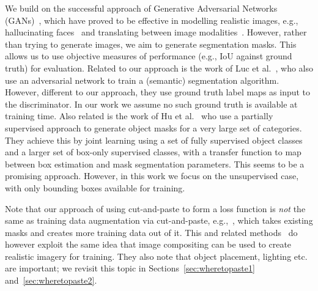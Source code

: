 \documentclass[runningheads]{llncs}
\begin{document}
We build on the successful approach of Generative Adversarial Networks (GANs)~\cite{goodfellow2014generative},
which have proved to be effective in modelling realistic images, e.g., hallucinating faces~\cite{karras2017progressive} and translating between image modalities~\cite{isola2017image}. 
However, rather than trying to generate images, we aim to generate segmentation masks. This allows us to use objective measures of performance (e.g., IoU against ground truth) for evaluation.
Related to our approach is the work of Luc et al.~\cite{luc2016semantic}, who also use an adversarial network to train a (semantic) segmentation algorithm. However, different to our approach, they use ground truth label maps as input to the discriminator. In our work we assume no such ground truth is available at training time.
Also related is the work of Hu et al.~\cite{hu2017learning} who use a partially supervised approach to generate object masks for a very large set of categories. 
They achieve this by joint learning using a set of fully supervised object classes and a larger set of box-only supervised classes, with a transfer function to map between box estimation and mask segmentation parameters. 
This seems to be a promising approach. 
However, in this work we focus on the unsupervised case, with only bounding boxes available for training.

Note that our approach of using cut-and-paste to form a loss function is \emph{not} the same as training data augmentation via cut-and-paste, e.g.,~\cite{dwibedi2017cut}, which takes existing masks and creates more training data out of it. This and related methods~\cite{georgakis2017synthesizing,alhaija2017augmented} do however exploit the same idea that image compositing can be used to create realistic imagery for training. They also note that object placement, lighting etc. are important; we revisit this topic in Sections~\ref{sec:wheretopaste1} and~\ref{sec:wheretopaste2}.
\end{document}
